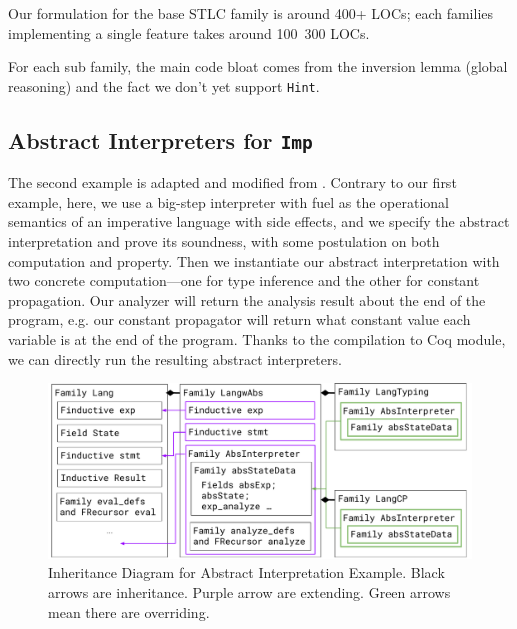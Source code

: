Our formulation for the base STLC family is around 400+ LOCs; each families implementing a single feature takes around 100~300 LOCs. 

For each sub family, the main code bloat comes from the inversion lemma (global reasoning) and the fact we don't yet support  \texttt{Hint}.


\subsection{Abstract Interpreters for \texttt{Imp}}
\label{sec:coqexample-analysis}
The second example is adapted and modified from \citet{zm2017}.
Contrary to our first example, here, we use a big-step interpreter with fuel
as the operational semantics of an imperative language with
side effects, and we specify the abstract interpretation and prove its
soundness, with some postulation on both computation and property. Then we instantiate our abstract interpretation with two concrete computation---one for type inference and the other for constant propagation. Our analyzer will return the analysis result about the end of the program, e.g. our constant propagator will return what constant value each variable is at the end of the program. Thanks to the compilation to Coq module, we can directly run the resulting
abstract interpreters.



\begin{figure}[!htb]
  \includegraphics[width=\columnwidth]{coqexmaple/Family-Lang-Imp3.pdf}
  \caption{Inheritance Diagram for Abstract Interpretation Example. Black arrows are inheritance. Purple arrow are extending. Green arrows mean there are overriding.}\label{fig:abstract-interpretation-example}
\end{figure}

